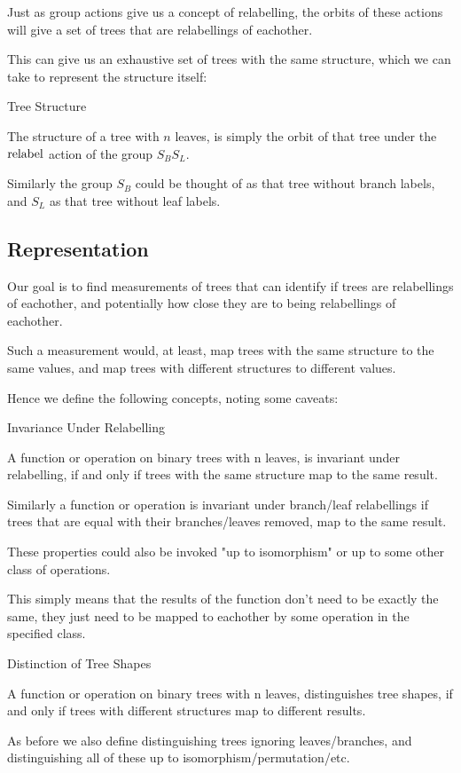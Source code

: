 \documentclass{report}
\begin{document}
Just as group actions give us a concept of relabelling, the orbits of these actions will give a set of trees that are relabellings of eachother.

This can give us an exhaustive set of trees with the same structure, which we can take to represent the structure itself:

\begin{definition} Tree Structure

	The structure of a tree with $n$ leaves, is simply the orbit of that tree under the $\operatorname{relabel}$ action of the group $S_BS_L$.

	Similarly the group $S_B$ could be thought of as that tree without branch labels, and $S_L$ as that tree without leaf labels.
\end{definition}

\subsection{Representation}

Our goal is to find measurements of trees that can identify if trees are relabellings of eachother, and potentially how close they are to being relabellings of eachother.

Such a measurement would, at least, map trees with the same structure to the same values, and map trees with different structures to different values.

Hence we define the following concepts, noting some caveats:

\begin{definition} Invariance Under Relabelling

	A function or operation on binary trees with n leaves, is invariant under relabelling, if and only if trees with the same structure map to the same result.

	Similarly a function or operation is invariant under branch/leaf relabellings if trees that are equal with their branches/leaves removed, map to the same result.

	These properties could also be invoked "up to isomorphism" or up to some other class of operations.

	This simply means that the results of the function don't need to be exactly the same, they just need to be mapped to eachother by some operation in the specified class.
\end{definition}

\begin{definition} Distinction of Tree Shapes

	A function or operation on binary trees with n leaves, distinguishes tree shapes, if and only if trees with different structures map to different results.

	As before we also define distinguishing trees ignoring leaves/branches, and distinguishing all of these up to isomorphism/permutation/etc.
\end{definition}
\end{document}
